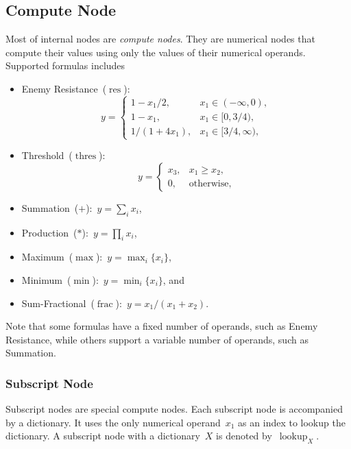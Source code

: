 \documentclass{article}
\DeclareMathOperator{\resNode}{res}
\DeclareMathOperator{\fracNode}{frac}
\DeclareMathOperator{\thresholdNode}{thres}
\DeclareMathOperator{\subscriptNode}{lookup}
\begin{document}
\subsection{Compute Node}

Most of internal nodes are \emph{compute nodes}.
They are numerical nodes that compute their values using only the values of their numerical operands.
Supported formulas includes
%
\begin{itemize}
	\item Enemy Resistance~($\resNode$):
	      \begin{equation*}
		      y = \begin{cases}
			      1 - x_1/2,    & x_1 \in (-\infty, 0),  \\
			      1 - x_1,      & x_1 \in [0, 3/4),      \\
			      1/(1 + 4x_1), & x_1 \in [3/4, \infty),
		      \end{cases}
	      \end{equation*}
	\item Threshold~($\thresholdNode$):
	      \begin{equation*}
		      y = \begin{cases}
			      x_3, & x_1 \ge x_2,      \\
			      0,   & \text{otherwise},
		      \end{cases}
	      \end{equation*}
	\item Summation~($+$):~$y = \sum_i x_i$,
	\item Production~($*$):~$y = \prod_i x_i$,
	\item Maximum~($\max$):~$y = \max_i\{ x_i \}$,
	\item Minimum~($\min$):~$y = \min_i\{ x_i \}$, and
	\item Sum-Fractional~($\fracNode$):~$y = {x_1} / (x_1 + x_2)$.
\end{itemize}
%
Note that some formulas have a fixed number of operands, such as Enemy Resistance, while others support a variable number of operands, such as Summation.

\subsubsection{Subscript Node}

Subscript nodes are special compute nodes.
Each subscript node is accompanied by a dictionary.
It uses the only numerical operand~$x_1$ as an index to lookup the dictionary.
A subscript node with a dictionary~$X$ is denoted by~$\subscriptNode_X$.
\end{document}
